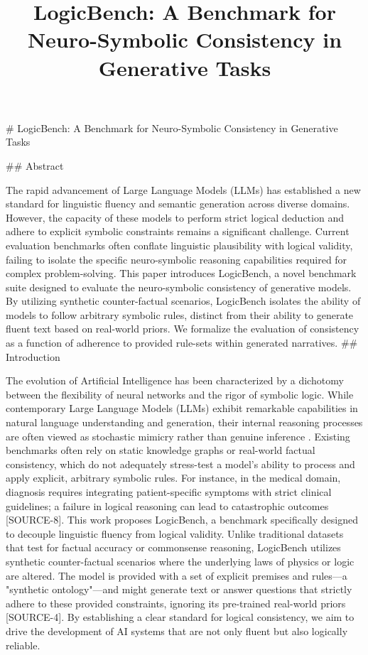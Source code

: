 \documentclass{article}
\title{LogicBench: A Benchmark for Neuro-Symbolic Consistency in Generative Tasks}
\date{}
\begin{document}
\maketitle
\# LogicBench: A Benchmark for Neuro-Symbolic Consistency in Generative Tasks

\#\# Abstract

The rapid advancement of Large Language Models (LLMs) has established a new standard for linguistic fluency and semantic generation across diverse domains. However, the capacity of these models to perform strict logical deduction and adhere to explicit symbolic constraints remains a significant challenge. Current evaluation benchmarks often conflate linguistic plausibility with logical validity, failing to isolate the specific neuro-symbolic reasoning capabilities required for complex problem-solving. This paper introduces LogicBench, a novel benchmark suite designed to evaluate the neuro-symbolic consistency of generative models. By utilizing synthetic counter-factual scenarios, LogicBench isolates the ability of models to follow arbitrary symbolic rules, distinct from their ability to generate fluent text based on real-world priors. We formalize the evaluation of consistency as a function of adherence to provided rule-sets within generated narratives. \#\# Introduction

The evolution of Artificial Intelligence has been characterized by a dichotomy between the flexibility of neural networks and the rigor of symbolic logic. While contemporary Large Language Models (LLMs) exhibit remarkable capabilities in natural language understanding and generation, their internal reasoning processes are often viewed as stochastic mimicry rather than genuine inference .  Existing benchmarks often rely on static knowledge graphs or real-world factual consistency, which do not adequately stress-test a model's ability to process and apply explicit, arbitrary symbolic rules. For instance, in the medical domain, diagnosis requires integrating patient-specific symptoms with strict clinical guidelines; a failure in logical reasoning can lead to catastrophic outcomes [SOURCE-8]. This work proposes LogicBench, a benchmark specifically designed to decouple linguistic fluency from logical validity. Unlike traditional datasets that test for factual accuracy or commonsense reasoning, LogicBench utilizes synthetic counter-factual scenarios where the underlying laws of physics or logic are altered. The model is provided with a set of explicit premises and rules—a "synthetic ontology"—and might generate text or answer questions that strictly adhere to these provided constraints, ignoring its pre-trained real-world priors [SOURCE-4].  By establishing a clear standard for logical consistency, we aim to drive the development of AI systems that are not only fluent but also logically reliable.
\end{document}
